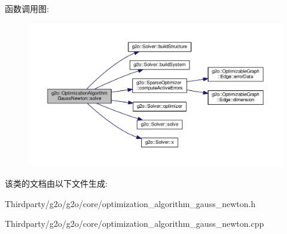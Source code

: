 函数调用图\-:
\nopagebreak
\begin{figure}[H]
\begin{center}
\leavevmode
\includegraphics[width=350pt]{classg2o_1_1OptimizationAlgorithmGaussNewton_aba0b67eecaca01c576de7e605e5af5f1_cgraph}
\end{center}
\end{figure}




该类的文档由以下文件生成\-:\begin{DoxyCompactItemize}
\item 
Thirdparty/g2o/g2o/core/optimization\-\_\-algorithm\-\_\-gauss\-\_\-newton.\-h\item 
Thirdparty/g2o/g2o/core/optimization\-\_\-algorithm\-\_\-gauss\-\_\-newton.\-cpp\end{DoxyCompactItemize}
